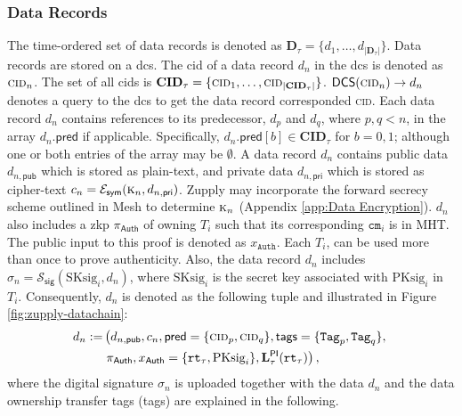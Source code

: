 \subsubsection{Data Records}
The time-ordered set of data records is denoted as $\mathbf{D}_\tau = \{d_1, \dots, d_{|\mathbf{D}_\tau|}\}$. Data records are stored on a \gls{dcs}. 
The \gls{cid} of a data record $d_n$ in the \gls{dcs} is denoted as $\textsc{cid}_n$.
The set of all \gls{cid}s is $\mathbf{CID}_\tau = \{\textsc{cid}_1, \dots, \textsc{cid}_{|\mathbf{CID}_\tau|}\}$. 
$\mathsf{DCS}(\textsc{cid}_n) \rightarrow d_n$ denotes a query to the \gls{dcs} to get the data record corresponded  \textsc{cid}.
Each data record $d_n$ contains references to its predecessor, $d_p$ and $d_q$, where $p,q < n$, in the array $d_n.\mathsf{pred}$ if applicable. Specifically, $d_n.\mathsf{pred}[b] \in \mathbf{CID}_\tau$ for ${b = 0, 1}$; although one or both entries of the array may be $\emptyset$.
A data record $d_n$ contains public data $d_{n, \mathsf{pub}}$ which is stored as plain-text, and private data $d_{n, \mathsf{pri}}$ which is stored as cipher-text $c_n = \mathcal{E}_\mathsf{sym}(\textsc{k}_n, d_{n, \mathsf{pri}})$. Zupply may incorporate the forward secrecy scheme outlined in Mesh \cite{altawy2019mesh} to determine $\textsc{k}_n$ (Appendix \ref{app:Data Encryption}). $d_n$ also includes a \gls{zkp} $\pi_\textsf{Auth}$ of owning $T_i$ such that its corresponding $\texttt{cm}_i$ is in \textsf{MHT}.  The public input to this proof is denoted as $x_\texttt{Auth}$. Each $T_i$, can be used more than once to prove authenticity.
Also, the data record $d_n$ includes $\sigma_n = \mathcal{S}_\mathsf{sig}(\text{SKsig}_i, d_n)$, where $\text{SKsig}_i$ is the secret key associated with $\text{PKsig}_{i}$ in $T_i$. Consequently, $d_n$ is denoted as the following tuple and illustrated in Figure \ref{fig:zupply-datachain}:
\begin{align*}
    d_n  := & \left( d_{n, \mathsf{pub}}, c_n, \mathsf{pred}=\{\textsc{cid}_p, \textsc{cid}_q\}, \mathsf{tags}=\{\texttt{Tag}_p, \texttt{Tag}_q\}, \right. \\ 
    & \left. \pi_\textsf{Auth}, x_\textsf{Auth}=\{\texttt{rt}_\tau, \text{PKsig}_{i}\}, \mathbf{L}_\tau^\mathsf{PI}(\texttt{rt}_\tau) \right),
\end{align*}
where the digital signature $\sigma_n$  is uploaded together with the data  $d_n$ and the data ownership transfer tags (\textsf{tags}) are explained in the following.


